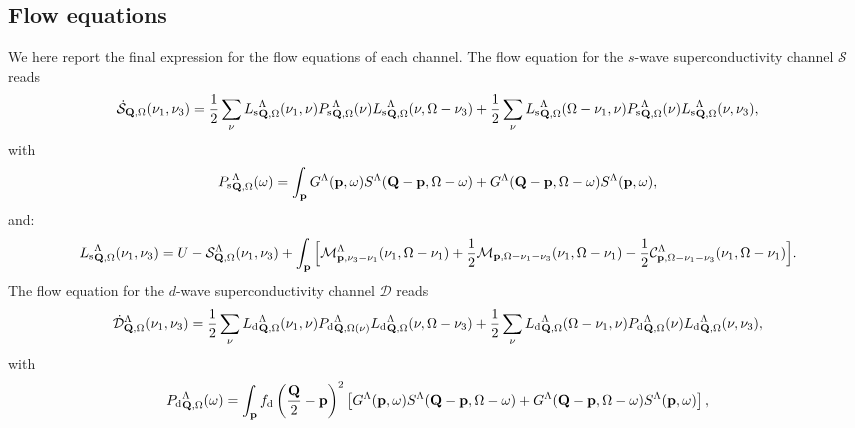 \subsection{Flow equations}
\label{sec:FlowEquations}

We here report the final expression for the flow equations of each channel.
The flow equation for the $s$-wave superconductivity channel $\mathcal{S}$ reads
\begin{equation}
\dot{\mathcal{S}}_{\mathbf{Q},\Omega}(\nu_1,\nu_3) = 
  \frac{1}{2} \sum_{\nu}{L_\mathrm{s}}^{\Lambda}_{\mathbf{Q},\Omega} (\nu_1,\nu) {P_{\mathrm{s}}}^{\Lambda}_{\mathbf{Q},\Omega}(\nu) {L_\mathrm{s}}^{\Lambda}_{\mathbf{Q},\Omega} (\nu,\Omega-\nu_3)
+ \frac{1}{2} \sum_{\nu}{L_\mathrm{s}}^{\Lambda}_{\mathbf{Q},\Omega} (\Omega-\nu_1,\nu) {P_{\mathrm{s}}}^{\Lambda}_{\mathbf{Q},\Omega}(\nu) {L_\mathrm{s}}^{\Lambda}_{\mathbf{Q},\Omega}(\nu,\nu_3),
\end{equation} 	   
with
\begin{equation}
{P_{\mathrm{s}}}^{\Lambda}_{\mathbf{Q},\Omega}(\omega) = \int_{\mathbf{p}}  G^{\Lambda}(\mathbf{p},\omega)S^{\Lambda}(\mathbf{Q}-\mathbf{p},\Omega-\omega) + 
G^{\Lambda}(\mathbf{Q}-\mathbf{p},\Omega-\omega) S^{\Lambda}(\mathbf{p},\omega), 
\label{eq:app:P_pp}
\end{equation} 
and: 
\begin{align} 
\label{eq:Lswave}
{L_\mathrm{s}}^{\Lambda}_{\mathbf{Q},\Omega}(\nu_1,\nu_3) = U-\mathcal{S}^{\Lambda}_{\mathbf{Q},\Omega} (\nu_1,\nu_3)
+ \int_{\mathbf{p}}  \Big[ \mathcal{M}^{\Lambda}_{\mathbf{p},\nu_3-\nu_1}(\nu_1,\Omega-\nu_1) + \frac{1}{2} \mathcal{M}_{\mathbf{p},\Omega-\nu_1-\nu_3}(\nu_1,\Omega-\nu_1) 
- \frac{1}{2} \mathcal{C}^{\Lambda}_{\mathbf{p},\Omega-\nu_1-\nu_3}(\nu_1,\Omega-\nu_1) \Big]. 
\end{align}	 
The flow equation for the $d$-wave superconductivity channel  $\mathcal{D}$ reads
\begin{equation}
\dot{\mathcal{D}}^{\Lambda}_{\mathbf{Q},\Omega}(\nu_1,\nu_3) = 
  \frac{1}{2} \sum_{\nu}{L_\mathrm{d}}^{\Lambda}_{\mathbf{Q},\Omega}(\nu_1,\nu) {P_{\mathrm{d}}}^{\Lambda}_{\mathbf{Q},\Omega(\nu)} {L_\mathrm{d}}^{\Lambda}_{\mathbf{Q},\Omega} (\nu,\Omega-\nu_3) 
+ \frac{1}{2} \sum_{\nu}{L_\mathrm{d}}^{\Lambda}_{\mathbf{Q},\Omega}(\Omega-\nu_1,\nu) {P_{\mathrm{d}}}^{\Lambda}_{\mathbf{Q},\Omega}(\nu) {L_\mathrm{d}}^{\Lambda}_{\mathbf{Q},\Omega}(\nu,\nu_3),
\label{eq:dwaveflow}
\end{equation}
with
\begin{equation}
{P_{\mathrm{d}}}^{\Lambda}_{\mathbf{Q},\Omega}(\omega) = \int_{\mathbf{p}}  f_{\mathrm{d}}\left(\frac{\mathbf{Q}}{2}-\mathbf{p}\right)^2 
\left[ G^{\Lambda}(\mathbf{p},\omega)S^{\Lambda}(\mathbf{Q}-\mathbf{p},\Omega-\omega) +G^{\Lambda}(\mathbf{Q}-\mathbf{p},\Omega-\omega)
S^{\Lambda}(\mathbf{p},\omega) \right], 
\label{eq:app:P_pp}
\end{equation} 
